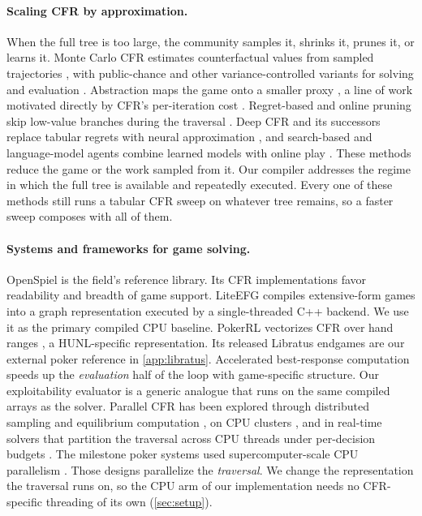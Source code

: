 \paragraph{Scaling CFR by approximation.}
When the full tree is too large, the community samples it, shrinks it, prunes it, or
learns it. Monte Carlo CFR estimates counterfactual values from sampled trajectories
\cite{lanctot2009monte}, with public-chance and other variance-controlled variants
for solving and evaluation
\cite{johanson2012efficient,burch2012efficient,schmid2019variance,li2026correlated,li2026av}.
Abstraction maps the game onto a smaller proxy
\cite{gilpin2007lossless,waugh2009abstraction,kroer2018unified,li2024rl,li2025efficient,li2026effective,li2026abstraction},
a line of work motivated directly by CFR's per-iteration cost
\cite{johanson2012efficient,brown2015hierarchical}. Regret-based and online pruning
skip low-value branches during the traversal \cite{brown2015regret,li2025efficient}.
Deep CFR and its successors replace tabular regrets with neural approximation
\cite{brown2019deep,DBLP:journals/corr/abs-1901-07621}, and search-based and
language-model agents combine learned models with online play
\cite{brown2020combining,schmid2023student,li2026pokerskill,wang2026solver}. These methods reduce the game or the
work sampled from it. Our compiler addresses the regime in which the full tree is
available and repeatedly executed. Every one of these methods still runs a tabular CFR
sweep on whatever tree remains, so a faster sweep composes with all of them.

\paragraph{Systems and frameworks for game solving.}
OpenSpiel \cite{lanctot2019openspiel} is the field's reference library. Its CFR
implementations favor readability and breadth of game support. LiteEFG
\cite{liu2024liteefg} compiles extensive-form games into a graph representation
executed by a single-threaded C++ backend. We use it as the primary compiled CPU
baseline. PokerRL \cite{steinberger2019pokerrl} vectorizes CFR over hand ranges
\cite{johanson2012efficient,moravvcik2017deepstack}, a HUNL-specific representation.
Its released Libratus endgames are our external poker reference in
\cref{app:libratus}. Accelerated best-response computation
\cite{johanson2011accelerating} speeds up the \emph{evaluation} half of the loop with
game-specific structure. Our exploitability evaluator is a generic analogue that runs
on the same compiled arrays as the solver. Parallel CFR has been explored through
distributed sampling and equilibrium computation
\cite{jackson2013slumbot,brown2015hierarchical}, on CPU clusters
\cite{DBLP:conf/ispa/ZhangLZXW21a}, and in real-time solvers that partition the
traversal across CPU threads under per-decision budgets \cite{li2026real}. The
milestone poker systems used supercomputer-scale CPU parallelism
\cite{bowling2015heads,brown2018superhuman}. Those designs parallelize the
\emph{traversal}. We change the representation the traversal runs on, so the CPU arm
of our implementation needs no CFR-specific threading of its own (\cref{sec:setup}).


